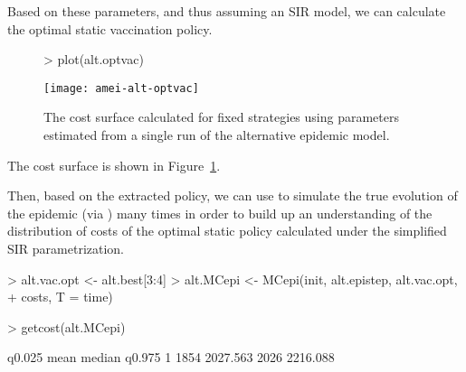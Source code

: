 \documentclass[shortnames,nojss]{jss}
\begin{document}
Based on these parameters, and thus assuming an SIR model, we can
calculate the optimal static vaccination policy.
\begin{Schunk}
\end{Schunk}
\begin{figure}[ht!]
\begin{Schunk}
\begin{Sinput}
> plot(alt.optvac)
\end{Sinput}
\end{Schunk}
\centering
\texttt{[image: amei-alt-optvac]}
\caption{The cost surface calculated for fixed strategies using parameters estimated from a single run of the alternative epidemic model.}
\label{f:alt-optvac}
\end{figure} 
The cost surface is shown in Figure~\ref{f:alt-optvac}.

Then, based on the extracted policy, we can use  to
simulate the true evolution of the epidemic (via )
many times in order to build up an understanding of the distribution
of costs of the optimal static policy calculated under the simplified
SIR parametrization.
\begin{Schunk}
\begin{Sinput}
> alt.vac.opt <- alt.best[3:4]
> alt.MCepi <- MCepi(init, alt.epistep, alt.vac.opt, 
+     costs, T = time)
\end{Sinput}
\end{Schunk}
\begin{Schunk}
\begin{Sinput}
> getcost(alt.MCepi)
\end{Sinput}
\begin{Soutput}
  q0.025     mean median   q0.975
1   1854 2027.563   2026 2216.088
\end{Soutput}
\end{Schunk}
\end{document}
